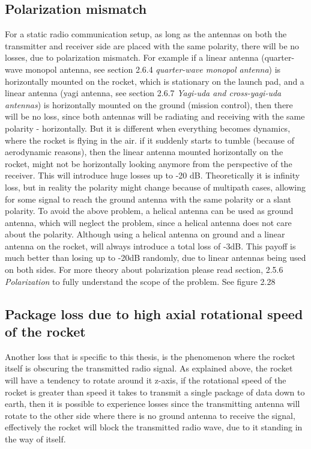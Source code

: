 \subsection{Polarization mismatch}
For a static radio communication setup, as long as the antennas on both the transmitter and receiver side are placed with the same polarity, there will be no losses, due to polarization mismatch. For example if a linear antenna (quarter-wave monopol antenna, see section 2.6.4 \textit{quarter-wave monopol antenna}) is horizontally mounted on the rocket, which is stationary on the launch pad, and a linear antenna (yagi antenna, see section 2.6.7 \textit{Yagi-uda and cross-yagi-uda antennas}) is horizontally mounted on the ground (mission control), then there will be no loss, since both antennas will be radiating and receiving with the same polarity - horizontally. But it is different when everything becomes dynamics, where the rocket is flying in the air. if it suddenly starts to tumble (because of aerodynamic reasons), then the linear antenna mounted horizontally on the rocket, might not be horizontally looking anymore from the perspective of the receiver. This will introduce huge losses up to -20 dB. Theoretically it is infinity loss, but in reality the polarity might change because of multipath cases, allowing for some signal to reach the ground antenna with the same polarity or a slant polarity. To avoid the above problem, a helical antenna can be used as ground antenna, which will neglect the problem, since a helical antenna does not care about the polarity. Although using a helical antenna on ground and a linear antenna on the rocket, will always introduce a total loss of -3dB. This payoff is much better than losing up to -20dB randomly, due to linear antennas being used on both sides. For more theory about polarization please read section, 2.5.6 \textit{Polarization} to fully understand the scope of the problem. See figure 2.28 

\subsection{Package loss due to high axial rotational speed of the rocket}
Another loss that is specific to this thesis, is the phenomenon where the rocket itself is obscuring the transmitted radio signal. As explained above, the rocket will have a tendency to rotate around it z-axis, if the rotational speed of the rocket is greater than speed it takes to transmit a single package of data down to earth, then it is possible to experience losses since the transmitting antenna will rotate to the other side where there is no ground antenna to receive the signal, effectively the rocket will block the transmitted radio wave, due to it standing in the way of itself. 

